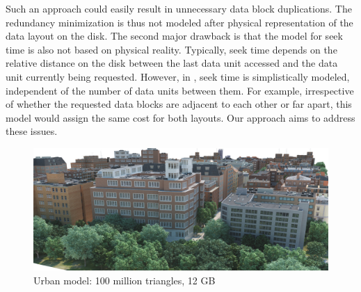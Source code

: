 Such an approach could easily result in unnecessary data
block duplications. The redundancy minimization is thus not modeled after
physical representation of the data layout on the disk. The second major
drawback is that the model for seek time is also not based on physical reality.
Typically, seek time depends on the relative distance on the disk between the
last data unit accessed and the data unit currently being requested. However,
in \cite{optimizingredundancy}, seek time is simplistically modeled,
independent of the number of data units between them. For example,
irrespective of whether the requested data blocks are adjacent to
each other or far apart, this model would assign the same cost for both
layouts. Our approach
aims to address these issues. 


\begin{figure}[t]
  \centering
  \includegraphics[width=\columnwidth]{densecity.jpg}
  \caption{Urban model: 100 million triangles, 12 GB }
  \label{fig:model3}
\end{figure}


